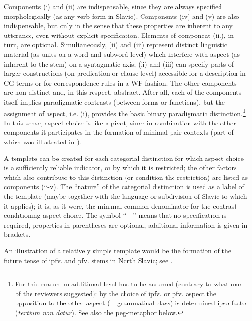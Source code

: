 \documentclass[output=paper]{langscibook}
\begin{document}
Components (i) and (ii) are indispensable, since they are always specified morphologically (as any verb form in Slavic). Components (iv) and (v) are also indispensable, but only in the sense that these properties are inherent to any utterance, even without explicit specification. Elements of component (iii), in turn, are optional. Simultaneously, (ii) and (iii) represent distinct linguistic material (as units on a word and subword level) which interfere with aspect (as inherent to the stem) on a syntagmatic axis; (ii) and (iii) can specify parts of larger constructions (on predication or clause level) accessible for a description in CG terms or for correspondence rules in a WP fashion. The other components are non-distinct and, in this respect, abstract. After all, each of the components itself implies paradigmatic contrasts (between forms or functions), but the assignment of aspect, i.e. (i), provides the basic binary paradigmatic distinction.\footnote{For this reason no additional level has to be assumed (contrary to what one of the reviewers suggested): by the choice of ipfv. or pfv. aspect the opposition to the other aspect (= grammatical class) is determined ipso facto (\textit{tertium non datur}). See also the peg-metaphor below.} In this sense, aspect choice is like a pivot, since in combination with the other components it participates in the formation of minimal pair contexts (part of which was illustrated in ).

A template can be created for each categorial distinction for which aspect choice is a sufficiently reliable indicator, or by which it is restricted; the other factors which also contribute to this distinction (or condition the restriction) are listed as components (ii-v). The “nature” of the categorial distinction is used as a label of the template (maybe together with the language or subdivision of Slavic to which it applies); it is, as it were, the minimal common denominator for the contrast conditioning aspect choice. The symbol ``---'' means that no specification is required, properties in parentheses are optional, additional information is given in brackets.

An illustration of a relatively simple template would be the formation of the future tense of ipfv. and pfv. stems in North Slavic; see .
\end{document}
